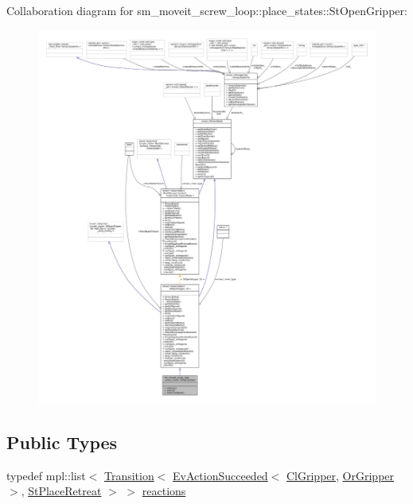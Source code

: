 Collaboration diagram for sm\+\_\+moveit\+\_\+screw\+\_\+loop\+:\+:place\+\_\+states\+:\+:St\+Open\+Gripper\+:
\nopagebreak
\begin{figure}[H]
\begin{center}
\leavevmode
\includegraphics[width=350pt]{structsm__moveit__screw__loop_1_1place__states_1_1StOpenGripper__coll__graph}
\end{center}
\end{figure}
\subsection*{Public Types}
\begin{DoxyCompactItemize}
\item 
typedef mpl\+::list$<$ \hyperlink{classsmacc_1_1Transition}{Transition}$<$ \hyperlink{structsmacc_1_1default__events_1_1EvActionSucceeded}{Ev\+Action\+Succeeded}$<$ \hyperlink{classsm__moveit__screw__loop_1_1cl__gripper_1_1ClGripper}{Cl\+Gripper}, \hyperlink{classsm__moveit__screw__loop_1_1OrGripper}{Or\+Gripper} $>$, \hyperlink{structsm__moveit__screw__loop_1_1place__states_1_1StPlaceRetreat}{St\+Place\+Retreat} $>$ $>$ \hyperlink{structsm__moveit__screw__loop_1_1place__states_1_1StOpenGripper_ad5cf03bea58766aa719db84ac1c98bf1}{reactions}
\end{DoxyCompactItemize}
